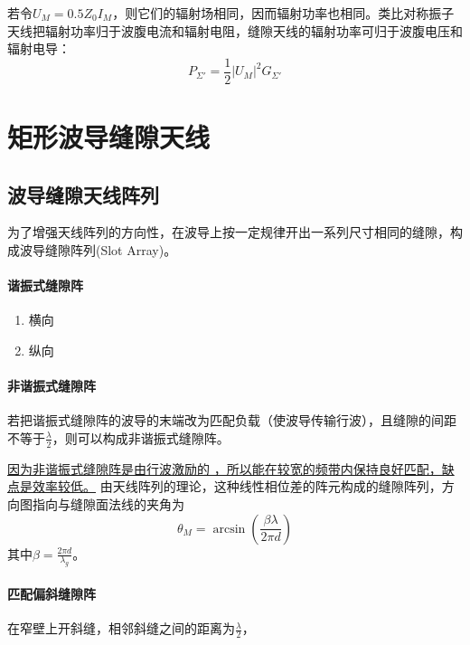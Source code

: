     若令$U_M=0.5 Z_0I_M$，则它们的辐射场相同，因而辐射功率也相同。类比对称振子天线把辐射功率归于波腹电流和辐射电阻，缝隙天线的辐射功率可归于波腹电压和辐射电导：
    \begin{equation}
        P_{\varSigma '}=\frac{1}{2}\left\vert U_M\right\vert^2G_{\varSigma '}
    \end{equation}


\section{矩形波导缝隙天线}
    
    
    \subsection{波导缝隙天线阵列}
    为了增强天线阵列的方向性，在波导上按一定规律开出一系列尺寸相同的缝隙，构成波导缝隙阵列(Slot Array)。

    \paragraph{谐振式缝隙阵}
    \begin{enumerate}
    \renewcommand*\labelenumi{\circled{\theenumi}}
        \item 横向
        \item 纵向
    \end{enumerate} 

    \paragraph{非谐振式缝隙阵}
    若把谐振式缝隙阵的波导的末端改为匹配负载（使波导传输行波），且缝隙的间距不等于$\frac{\lambda}{2}$，则可以构成非谐振式缝隙阵。

    \underline{因为非谐振式缝隙阵是由行波激励的 ，所以能在较宽的频带内保持良好匹配，缺点是效率较低。}
    由天线阵列的理论，这种线性相位差的阵元构成的缝隙阵列，方向图指向与缝隙面法线的夹角为
    \begin{equation}
        \theta_M=\arcsin\left(\frac{\beta \lambda}{2 \pi d}\right)
    \end{equation}
    其中$\beta=\frac{2 \pi d}{\lambda_g}$。


    \paragraph{匹配偏斜缝隙阵}
    在窄壁上开斜缝，相邻斜缝之间的距离为$\frac{\lambda}{2}$，




